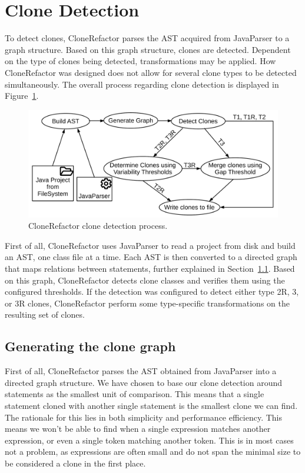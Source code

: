 \section{Clone Detection}\label{sec:clonedetection}
To detect clones, CloneRefactor parses the AST acquired from JavaParser to a graph structure. Based on this graph structure, clones are detected. Dependent on the type of clones being detected, transformations may be applied. How CloneRefactor was designed does not allow for several clone types to be detected simultaneously. The overall process regarding clone detection is displayed in Figure~\ref{fig:clonedetection}.

\begin{figure}[H]
  \centering
  \includegraphics[width=1\columnwidth]{img/CloneDetection}
  \caption{CloneRefactor clone detection process.}
  \label{fig:clonedetection}
\end{figure}

First of all, CloneRefactor uses JavaParser to read a project from disk and build an AST, one class file at a time. Each AST is then converted to a directed graph that maps relations between statements, further explained in Section~\ref{sec:clonegraph}. Based on this graph, CloneRefactor detects clone classes and verifies them using the configured thresholds. If the detection was configured to detect either type 2R, 3, or 3R clones, CloneRefactor perform some type-specific transformations on the resulting set of clones.


\subsection{Generating the clone graph}\label{sec:clonegraph}
First of all, CloneRefactor parses the AST obtained from JavaParser into a directed graph structure. We have chosen to base our clone detection around statements as the smallest unit of comparison. This means that a single statement cloned with another single statement is the smallest clone we can find. The rationale for this lies in both simplicity and performance efficiency. This means we won't be able to find when a single expression matches another expression, or even a single token matching another token. This is in most cases not a problem, as expressions are often small and do not span the minimal size to be considered a clone in the first place.


